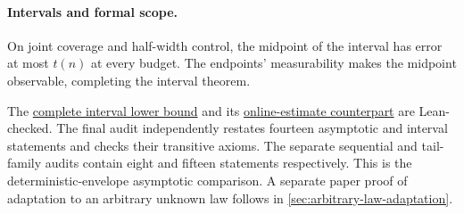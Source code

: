 \paragraph{Intervals and formal scope.}
On joint coverage and half-width control, the midpoint of the interval
has error at most $t(n)$ at every budget. The endpoints' measurability
makes the midpoint observable, completing the interval theorem.

The \href{https://github.com/davidiach/adaptive-threshold-estimation/blob/a6c77f546604cb6df7df67802e0061d1345fa2ca/lean/ThresholdHC/AnytimeLower/Intervals.lean}{complete interval lower bound}
and its \href{https://github.com/davidiach/adaptive-threshold-estimation/blob/a6c77f546604cb6df7df67802e0061d1345fa2ca/lean/ThresholdHC/AnytimeLower/Full.lean}{online-estimate counterpart}
are Lean-checked. The final audit independently restates fourteen
asymptotic and interval statements and checks their transitive axioms.
The separate sequential and tail-family audits contain eight and fifteen
statements respectively. This is the deterministic-envelope asymptotic
comparison. A separate paper proof of adaptation to an arbitrary unknown
law follows in \cref{sec:arbitrary-law-adaptation}.

\clearpage


\clearpage


\clearpage

